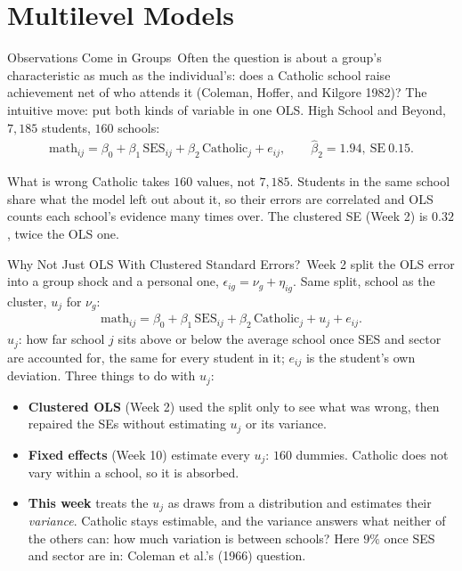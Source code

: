\documentclass[aspectratio=169,11pt,xcolor=dvipsnames]{beamer}
\newcommand{\core}{\,\raisebox{0.6pt}{\textcolor{corestar}{$\bigstar$}}}
\begin{document}
\section[Multilevel]{Multilevel Models}
\begin{frame}\sectionpage\end{frame}

\begin{frame}{Observations Come in Groups\core}
Often the question is about a group's characteristic as much as the
individual's: does a Catholic school raise achievement net of who attends it
(Coleman, Hoffer, and Kilgore 1982)? The intuitive move: put both kinds of
variable in one OLS. High School and Beyond, $7{,}185$ students, $160$ schools:
\begingroup
\setlength{\abovedisplayskip}{2pt}\setlength{\belowdisplayskip}{2pt}
\begin{align*}
  \text{math}_{ij} = \beta_0 + \beta_1\,\text{SES}_{ij}
  + \beta_2\,\text{Catholic}_j + e_{ij},
  \qquad \hat\beta_2 = 1.94,\ \text{SE}\ 0.15.
\end{align*}
\endgroup
\begin{alertblock}{What is wrong}
Catholic takes $160$ values, not $7{,}185$. Students in the same school share
what the model left out about it, so their errors are correlated and OLS counts
each school's evidence many times over. The clustered SE (Week 2) is $0.32$,
twice the OLS one.
\end{alertblock}
\end{frame}

\begin{frame}{Why Not Just OLS With Clustered Standard Errors?\core}
Week 2 split the OLS error into a group shock and a personal one,
$\epsilon_{ig} = \nu_g + \eta_{ig}$. Same split, school as the cluster,
$u_j$ for $\nu_g$:
\begingroup
\setlength{\abovedisplayskip}{2pt}\setlength{\belowdisplayskip}{2pt}
\begin{align*}
  \text{math}_{ij} = \beta_0 + \beta_1\,\text{SES}_{ij}
  + \beta_2\,\text{Catholic}_j + u_j + e_{ij}.
\end{align*}
\endgroup
$u_j$: how far school $j$ sits above or below the average school once SES
and sector are accounted for, the same for every student in it; $e_{ij}$ is
the student's own deviation. Three things to do with $u_j$:
\begin{itemize}\itemsep1pt
  \item \textbf{Clustered OLS} (Week 2) used the split only to see what was
        wrong, then repaired the SEs without estimating $u_j$ or its variance.
  \item \textbf{Fixed effects} (Week 10) estimate every $u_j$: $160$
        dummies. Catholic does not vary within a school, so it is absorbed.
  \item \textbf{This week} treats the $u_j$ as draws from a distribution and
        estimates their \emph{variance}. Catholic stays estimable, and the
        variance answers what neither of the others can: how much variation
        is between schools? Here $9\%$ once SES and sector are in:
        Coleman et al.'s (1966) question.
\end{itemize}
\end{frame}
\end{document}

